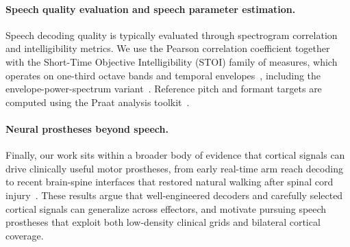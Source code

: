\paragraph{Speech quality evaluation and speech parameter estimation.}
Speech decoding quality is typically evaluated through spectrogram correlation and intelligibility metrics. We use the Pearson correlation coefficient together with the Short-Time Objective Intelligibility (STOI) family of measures, which operates on one-third octave bands and temporal envelopes~\cite{taal2011algorithm}, including the envelope-power-spectrum variant~\cite{relanoiborra2016sepsm}. Reference pitch and formant targets are computed using the Praat analysis toolkit~\cite{boersma2001praat}.

\paragraph{Neural prostheses beyond speech.}
Finally, our work sits within a broader body of evidence that cortical signals can drive clinically useful motor prostheses, from early real-time arm reach decoding~\cite{wessberg2000realtime} to recent brain-spine interfaces that restored natural walking after spinal cord injury~\cite{lorach2023walking}. These results argue that well-engineered decoders and carefully selected cortical signals can generalize across effectors, and motivate pursuing speech prostheses that exploit both low-density clinical grids and bilateral cortical coverage.
